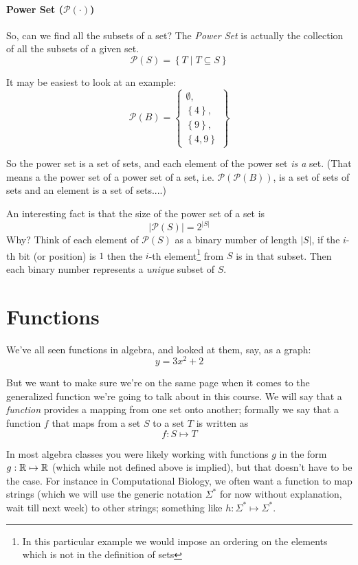 \documentclass[11pt, oneside]{article}   	%
\begin{document}
\paragraph{Power Set ($\mathcal{P}(\cdot)$)}

So, can we find all the subsets of a set?  
The \emph{Power Set} is actually the collection of all the subsets of a given set. 
\[
\mathcal{P}(S) = \left\{T \mid T \subseteq S\right\}
\]

It may be easiest to look at an example: 
\[
\mathcal{P}\left(B\right) = \left\{ \begin{matrix}\emptyset, \\ \left\{4\right\}, \\ \left\{9\right\}, \\\left\{4,9\right\}\end{matrix} \right\}
\]

So the power set is a set of sets, and each element of the power set \textit{is a} set.
(That means a the power set of a power set of a set, i.e. $\mathcal{P}\left(\mathcal{P}\left(B\right)\right)$, is a set of sets of sets and an element is a set of sets....) 

An interesting fact is that the size of the power set of a set is 
\[
\left|\mathcal{P}\left(S\right)\right| = 2^{|S|}
\]
Why? Think of each element of $\mathcal{P}\left(S\right)$ as a binary number of length $|S|$, 
if the $i$-th bit (or position) is $1$ then the $i$-th element\footnote{In this particular example we would impose an ordering on the elements which is not in the definition of sets} from $S$ is in that subset. 
Then each binary number represents a \textit{unique} subset of $S$. 

\section{Functions}

We've all seen functions in algebra, and looked at them, say, as a graph:
\[
y = 3x^2 + 2
\]

But we want to make sure we're on the same page when it comes to the generalized function we're going to talk about in this course. 
We will say that a \emph{function} provides a mapping from one set onto another; 
formally we say that a function $f$ that maps from a set $S$ to a set $T$ is written as 
\[
f: S \mapsto T
\]

In most algebra classes you were likely working with functions $g$ in the form $g: \operatorname{\mathbb{R}} \mapsto\operatorname{\mathbb{R}}$ (which while not defined above is implied), 
but that doesn't have to be the case. 
For instance in Computational Biology, we often want a function to map strings 
(which we will use the generic notation $\Sigma^*$ for now without explanation, wait till next week)
to other strings; 
something like $h: \Sigma^* \mapsto \Sigma^*$. 
\end{document}

